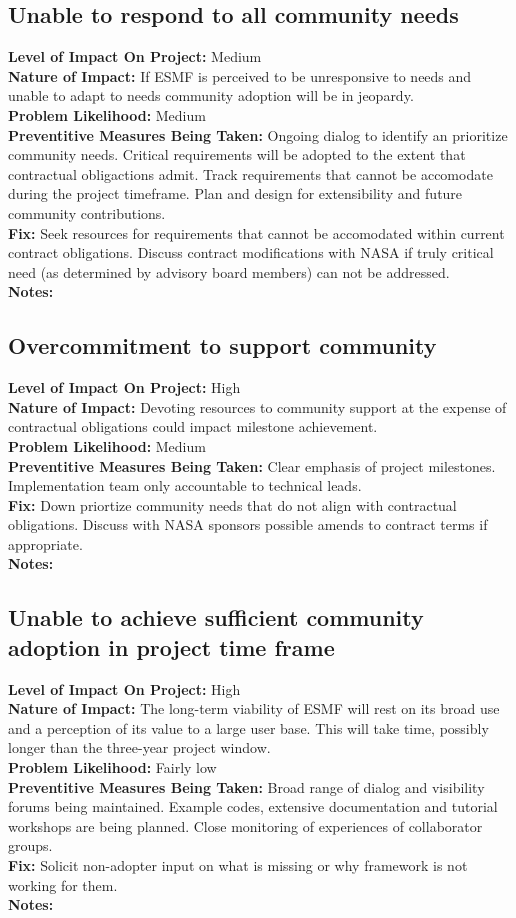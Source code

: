 \documentclass[english]{article}
\newcommand{\sreq}[1]{\subsection{\hspace{.2in}#1}}
\newenvironment
{reqlist}
{\begin{list} {} {} \rm \item[]}
{\end{list}}
\begin{document}
\sreq{Unable to respond to all community needs}
\begin{reqlist}
{\bf Level of Impact On Project:}  Medium \\
{\bf Nature of Impact:} If ESMF is perceived to be unresponsive to needs and unable to adapt to needs community adoption
will be in jeopardy.\\
{\bf Problem Likelihood:} Medium \\
{\bf Preventitive Measures Being Taken:} Ongoing dialog to identify an prioritize
community needs. Critical requirements will be adopted to the extent
that contractual obligactions admit. Track requirements that cannot be accomodate during the
project timeframe. Plan and design for extensibility and future community contributions.\\
{\bf Fix:} Seek resources for requirements that cannot be accomodated within current
contract obligations. Discuss contract modifications with NASA if truly critical
need (as determined by advisory board members) can not be addressed. \\
{\bf Notes:} \\
\end{reqlist}

\sreq{Overcommitment to support community}
\begin{reqlist}
{\bf Level of Impact On Project:} High \\
{\bf Nature of Impact:} Devoting resources to community support at the expense of contractual obligations
could impact milestone achievement.\\
{\bf Problem Likelihood:} Medium \\
{\bf Preventitive Measures Being Taken:} Clear emphasis of project milestones. Implementation
team only accountable to technical leads.\\
{\bf Fix:} Down priortize community needs that do not align with contractual obligations.
Discuss with NASA sponsors possible amends to contract terms if appropriate.\\
{\bf Notes:} \\
\end{reqlist}

\sreq{Unable to achieve sufficient community adoption in project time frame}
\begin{reqlist}
{\bf Level of Impact On Project:}  High \\
{\bf Nature of Impact:} The long-term viability of ESMF will rest on its broad use and a perception of
its value to a large user base. This will take time, possibly longer
than the three-year project window.\\
{\bf Problem Likelihood:} Fairly low \\
{\bf Preventitive Measures Being Taken:} Broad range of dialog and visibility 
forums being maintained. Example codes, extensive documentation and tutorial
workshops are being planned.
Close monitoring of experiences of collaborator groups.  \\
{\bf Fix:} Solicit non-adopter input on what is missing or why framework is not working for them.\\
{\bf Notes:} \\
\end{reqlist}
\end{document}
